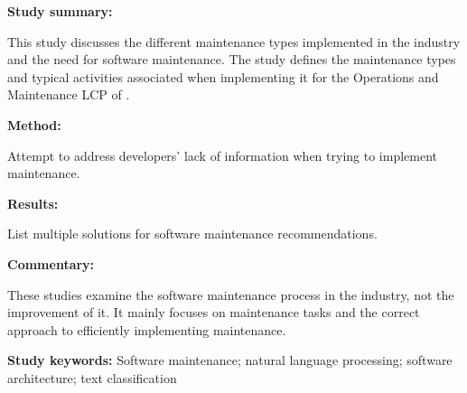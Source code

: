 \begin{tcolorbox}[colback=gray!5!white, colframe=pastelgreen!40!black, title=Supporting Software Architecture Maintenance by Providing Task-specific Recommendations \cite{Galster2019}]
	\begin{minipage}[t]{0.25\textwidth}
		\textbf{Study summary:}
	\end{minipage}
	\hfill
	\begin{minipage}[t]{0.65\textwidth}
		This study discusses the different maintenance types implemented in the industry and the
		need for software maintenance. The study defines the maintenance types and typical
		activities associated when implementing it for the Operations and Maintenance LCP of
		.
	\end{minipage}

	\vspace{0.75em} 

	\begin{minipage}[t]{0.25\textwidth}
		\textbf{Method:}
	\end{minipage}
	\hfill
	\begin{minipage}[t]{0.65\textwidth}
		Attempt to address developers' lack of information when trying to implement maintenance.
	\end{minipage}

	\vspace{0.75em} 

	\begin{minipage}[t]{0.25\textwidth}
		\textbf{Results:}
	\end{minipage}
	\hfill
	\begin{minipage}[t]{0.65\textwidth}
		List multiple solutions for software maintenance recommendations.
	\end{minipage}

	\vspace{0.75em} 

	\begin{minipage}[t]{0.25\textwidth}
		\textbf{Commentary:}
	\end{minipage}
	\hfill
	\begin{minipage}[t]{0.65\textwidth}
		These studies examine the software maintenance process in the industry, not the improvement
		of it. It mainly focuses on maintenance tasks and the correct approach to efficiently
		implementing maintenance.
	\end{minipage}
	\tcblower
	\textbf{Study keywords:} Software maintenance; natural language processing; software
	architecture; text classification
\end{tcolorbox}

